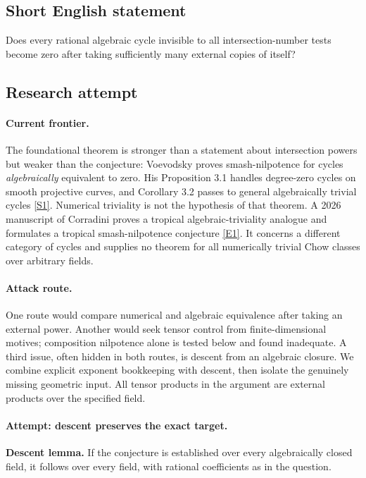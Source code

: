 \documentclass[11pt,a4paper]{article}
\newcommand{\sref}[2]{\hyperlink{source:#1:#2}{[S#2]}}
\newcommand{\eref}[2]{\hyperlink{extra:#1:#2}{[E#2]}}
\numberwithin{equation}{section}
\begin{document}
\subsection{Short English statement}
Does every rational algebraic cycle invisible to all intersection-number tests become zero after taking sufficiently many external copies of itself?
\subsection{Research attempt}

\paragraph{Current frontier.}
The foundational theorem is stronger than a statement about intersection
powers but weaker than the conjecture: Voevodsky proves smash-nilpotence
for cycles \emph{algebraically} equivalent to zero. His Proposition 3.1
handles degree-zero cycles on smooth projective curves, and Corollary 3.2
passes to general algebraically trivial cycles \sref{182}{1}.
Numerical triviality is not the hypothesis of that theorem. A 2026
manuscript of Corradini proves a tropical algebraic-triviality analogue
and formulates a tropical smash-nilpotence conjecture \eref{182}{1}.
It concerns a different category of cycles and supplies no theorem for
all numerically trivial Chow classes over arbitrary fields.

\paragraph{Attack route.}
One route would compare numerical and algebraic equivalence after taking
an external power. Another would seek tensor control from finite-dimensional
motives; composition nilpotence alone is tested below and found inadequate.
A third issue, often hidden in both routes, is descent from an algebraic
closure. We combine explicit exponent bookkeeping with descent, then
isolate the genuinely missing geometric input. All tensor products in the
argument are external products over the specified field.

\paragraph{Attempt: descent preserves the exact target.}
\textbf{Descent lemma.} If the conjecture is established over every
algebraically closed field, it follows over every field, with rational
coefficients as in the question.
\end{document}
